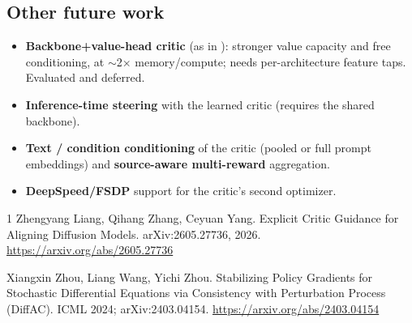 \documentclass[11pt]{article}
\theoremstyle{plain}
\theoremstyle{remark}
\begin{document}
\subsection{Other future work}
\begin{itemize}[leftmargin=1.4em]
  \item \textbf{Backbone+value-head critic} (as in \cite{liang2026critic}): stronger
  value capacity and free conditioning, at $\sim$2$\times$ memory/compute; needs
  per-architecture feature taps. Evaluated and deferred.
  \item \textbf{Inference-time steering} with the learned critic (requires the shared
  backbone).
  \item \textbf{Text / condition conditioning} of the critic (pooled or full prompt
  embeddings) and \textbf{source-aware multi-reward} aggregation.
  \item \textbf{DeepSpeed/FSDP} support for the critic's second optimizer.
\end{itemize}

\begin{thebibliography}{1}
Zhengyang Liang, Qihang Zhang, Ceyuan Yang.
\newblock Explicit Critic Guidance for Aligning Diffusion Models.
\newblock arXiv:2605.27736, 2026. \url{https://arxiv.org/abs/2605.27736}

Xiangxin Zhou, Liang Wang, Yichi Zhou.
\newblock Stabilizing Policy Gradients for Stochastic Differential Equations via
Consistency with Perturbation Process (DiffAC).
\newblock ICML 2024; arXiv:2403.04154. \url{https://arxiv.org/abs/2403.04154}
\end{thebibliography}
\end{document}
